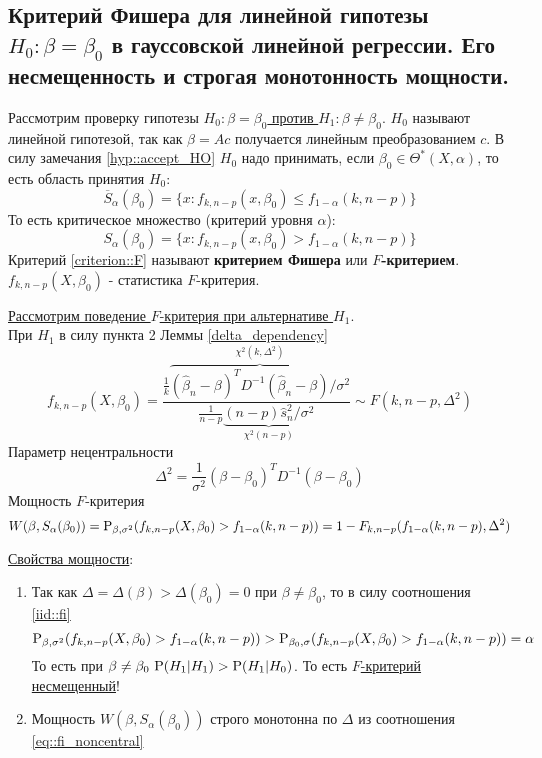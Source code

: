 \subsection{Критерий Фишера для линейной гипотезы $H_0:\beta=\beta_0$ в гауссовской линейной регрессии.
Его несмещенность и строгая монотонность мощности.}
Рассмотрим проверку гипотезы
\underline{$H_0:\beta=\beta_0$ против $H_1:\beta\neq\beta_0$}.
$H_0$ называют линейной гипотезой, так как $\beta=Ac$ получается
линейным преобразованием $c$.
В силу замечания \ref{hyp::accept_HO} $H_0$ надо принимать, если
$\beta_0\in\Theta^*(X,\alpha)$, то есть область принятия $H_0$:
\[\overline{S}_\alpha(\beta_0)=\{x:f_{k,n-p}(x,\beta_0)\leq f_{1-\alpha}(k,n-p)\}\]
То есть критическое множество (критерий уровня $\alpha$):
\begin{equation} \label{criterion::F}
    S_\alpha(\beta_0)=\{x:f_{k,n-p}(x,\beta_0)> f_{1-\alpha}(k,n-p)\}
\end{equation}
Критерий \ref{criterion::F} называют \textbf{критерием Фишера} или \textbf{$F$-критерием}.
$f_{k,n-p}(X,\beta_0)$ - статистика $F$-критерия.

\underline{Рассмотрим поведение $F$-критерия при альтернативе $H_1$}. \\
При $H_1$ в силу пункта 2 Леммы \ref{delta_dependency}
\[f_{k,n-p}(X,\beta_0)=\frac{\frac{1}{k}\overbrace{(\widehat{\beta}_n-\beta)^TD^{-1}(\widehat{\beta}_n-\beta)/\sigma^2}^{\chi^2(k,\Delta^2)}}{\frac{1}{n-p}\underbrace{(n-p)\widehat{s}^2_n/\sigma^2}_{\chi^2(n-p)}}\sim F(k,n-p,\Delta^2)\]
Параметр нецентральности
\begin{equation}\label{eq::fi_noncentral}
    \Delta^2 = \frac{1}{\sigma^2}(\beta-\beta_0)^TD^{-1}(\beta-\beta_0)
\end{equation}
Мощность $F$-критерия
\[W(\beta,S_\alpha(\beta_0))=\P_{\beta,\sigma^2}(f_{k,n-p}(X,\beta_0)>f_{1-\alpha}(k,n-p))=1-F_{k,n-p}(f_{1-\alpha}(k,n-p),\Delta^2)\]

\underline{Свойства мощности}:
\begin{enumerate}
    \item Так как $\Delta =\Delta(\beta)>\Delta(\beta_0)=0$ при $\beta\neq\beta_0$,
    то в силу соотношения \ref{iid::fi}
    \[\P_{\beta,\sigma^2}(f_{k,n-p}(X, \beta_0)>f_{1-\alpha}(k,n-p))>\P_{\beta_0,\sigma}(f_{k,n-p}(X,\beta_0)>f_{1-\alpha}(k,n-p))=\alpha\]
    То есть при $\beta\neq\beta_0\ \P(H_1\vert H_1)>\P(H_1\vert H_0)$.
    То есть \underline{$F$-критерий несмещенный}!
    \item Мощность $W(\beta,S_\alpha(\beta_0))$ строго монотонна по $\Delta$
    из соотношения \ref{eq::fi_noncentral}
\end{enumerate}

